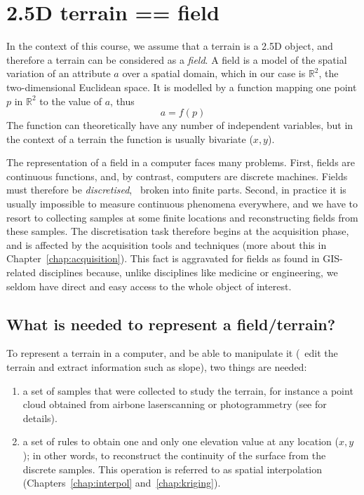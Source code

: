 %
\section{2.5D terrain == field}

In the context of this course, we assume that a terrain is a 2.5D object, and therefore a terrain can be considered as a \emph{field}.%
A field is a model of the spatial variation of an attribute $a$ over a spatial domain, which in our case is $\mathbb{R}^2$, the two-dimensional Euclidean space.%
It is modelled by a function mapping one point $p$ in $\mathbb{R}^2$ to the value of $a$, thus 
\[
  a = f(p)
\]
The function can theoretically have any number of independent variables, but in the context of a terrain the function is usually bivariate ($x,y$).

%

The representation of a field in a computer faces many problems. 
First, fields are continuous functions, and, by contrast, computers are discrete machines. 
Fields must therefore be \emph{discretised}, \ie\ broken into finite parts.%
Second, in practice it is usually impossible to measure continuous phenomena everywhere, and we have to resort to collecting samples at some finite locations and reconstructing fields from these samples.
The discretisation task therefore begins at the acquisition phase, and is affected by the acquisition tools and techniques (more about this in Chapter~\ref{chap:acquisition}).
This fact is aggravated for fields as found in GIS-related disciplines because, unlike disciplines like medicine or engineering, we seldom have direct and easy access to the whole object of interest.


\subsection{What is needed to represent a field/terrain?}

To represent a terrain in a computer, and be able to manipulate it (\ie\ edit the terrain and extract information such as slope), two things are needed:
\begin{enumerate}
  \item a set of samples that were collected to study the terrain, for instance a point cloud obtained from airbone laserscanning or photogrammetry (see  for details).
  \item a set of rules to obtain one and only one elevation value at any location ($x,y$); in other words, to reconstruct the continuity of the surface from the discrete samples.
  This operation is referred to as spatial interpolation (Chapters~\ref{chap:interpol} and~\ref{chap:kriging}). 
\end{enumerate}


